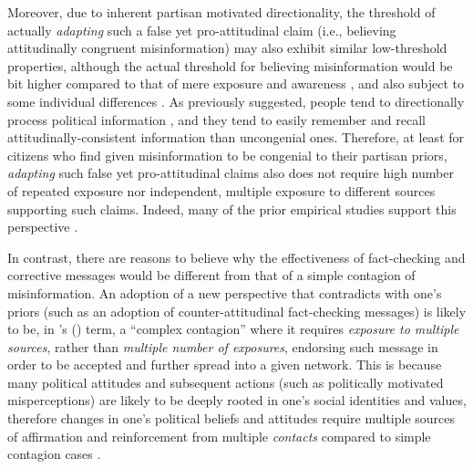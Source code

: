 \documentclass[man, 12pt, a4paper, noextraspace]{apa6}
\begin{document}
    Moreover, due to inherent partisan motivated directionality, the threshold of actually \emph{adapting} such a false yet pro-attitudinal claim (i.e., believing attitudinally congruent misinformation) may also exhibit similar low-threshold properties, although the actual threshold for believing misinformation would be bit higher compared to that of mere exposure and awareness \parencite[e.g.,][]{Monsted_plos2017}, and also subject to some individual differences \parencite[e.g.,][]{weeks2015emotions, flynn2017nature}. As previously suggested, people tend to directionally process political information \parencite{taber2006}, and they tend to easily remember and recall attitudinally-consistent information than uncongenial ones. Therefore, at least for citizens who find given misinformation to be congenial to their partisan priors, \emph{adapting} such false yet pro-attitudinal claims also does not require high number of repeated exposure nor independent, multiple exposure to different sources supporting such claims. Indeed, many of the prior empirical studies support this perspective \parencite[e.g.,][]{garrett2016driving, kuklinski2000misinformation, flynn2017nature}.         
    
    In contrast, there are reasons to believe why the effectiveness of fact-checking and corrective messages would be different from that of a simple contagion of misinformation. An adoption of a new perspective that contradicts with one's priors (such as an adoption of counter-attitudinal fact-checking messages) is likely to be, in \citeauthor{centola2007complex}'s (\citeyear{centola2007complex}) term, a \enquote{complex contagion} where it requires \emph{exposure to multiple sources}, rather than \emph{multiple number of exposures}, endorsing such message in order to be accepted and further spread into a given network. This is because many political attitudes and subsequent actions (such as politically motivated misperceptions) are likely to be deeply rooted in one’s social identities and values, therefore changes in one's political beliefs and attitudes require multiple sources of affirmation and reinforcement from multiple \emph{contacts} compared to simple contagion cases \parencite[e.g.,][]{gonzalez2017decoding, larson2016social, siegel2009social}. 
    
\end{document}
